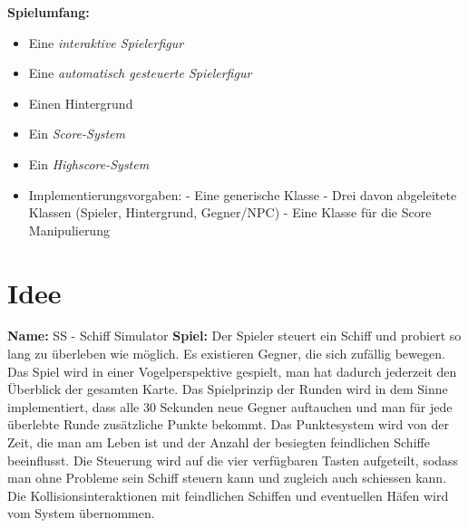\documentclass{article}
\begin{document}
\textbf{Spielumfang:}
\begin{itemize}
    \item Eine \textit{interaktive Spielerfigur}
    \item Eine \textit{automatisch gesteuerte Spielerfigur}
    \item Einen Hintergrund
    \item Ein \textit{Score-System}
    \item Ein \textit{Highscore-System}
    \item Implementierungsvorgaben:
        \newline - Eine generische Klasse
        \newline - Drei davon abgeleitete Klassen (Spieler, Hintergrund, Gegner/NPC)
        \newline - Eine Klasse für die Score Manipulierung
\end{itemize}
\newpage

\section{Idee}
\textbf{Name:}
\newline
SS - Schiff Simulator
\newline
\textbf{Spiel:}
\newline
Der Spieler steuert ein Schiff und probiert so lang zu überleben wie möglich. Es existieren Gegner, die sich zufällig bewegen.
\newline
Das Spiel wird in einer Vogelperspektive gespielt, man hat dadurch jederzeit den Überblick der gesamten Karte.
\newline
Das Spielprinzip der Runden wird in dem Sinne implementiert, dass alle 30 Sekunden neue Gegner auftauchen und man für jede überlebte Runde zusätzliche Punkte bekommt.
\newline
Das Punktesystem wird von der Zeit, die man am Leben ist und der Anzahl der besiegten feindlichen Schiffe beeinflusst.
\newline
Die Steuerung wird auf die vier verfügbaren Tasten aufgeteilt, sodass man ohne Probleme sein Schiff steuern kann und zugleich auch schiessen kann. Die Kollisionsinteraktionen mit feindlichen Schiffen und eventuellen Häfen wird vom System übernommen.
\newpage
\end{document}
